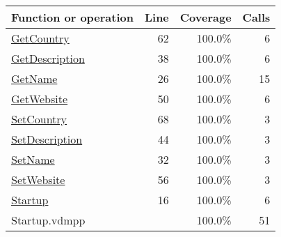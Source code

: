 \bigskip
\begin{longtable}{|l|r|r|r|}
\hline
Function or operation & Line & Coverage & Calls \\
\hline
\hline
\hyperref[GetCountry:62]{GetCountry} & 62&100.0\% & 6 \\
\hline
\hyperref[GetDescription:38]{GetDescription} & 38&100.0\% & 6 \\
\hline
\hyperref[GetName:26]{GetName} & 26&100.0\% & 15 \\
\hline
\hyperref[GetWebsite:50]{GetWebsite} & 50&100.0\% & 6 \\
\hline
\hyperref[SetCountry:68]{SetCountry} & 68&100.0\% & 3 \\
\hline
\hyperref[SetDescription:44]{SetDescription} & 44&100.0\% & 3 \\
\hline
\hyperref[SetName:32]{SetName} & 32&100.0\% & 3 \\
\hline
\hyperref[SetWebsite:56]{SetWebsite} & 56&100.0\% & 3 \\
\hline
\hyperref[Startup:16]{Startup} & 16&100.0\% & 6 \\
\hline
\hline
Startup.vdmpp & & 100.0\% & 51 \\
\hline
\end{longtable}


